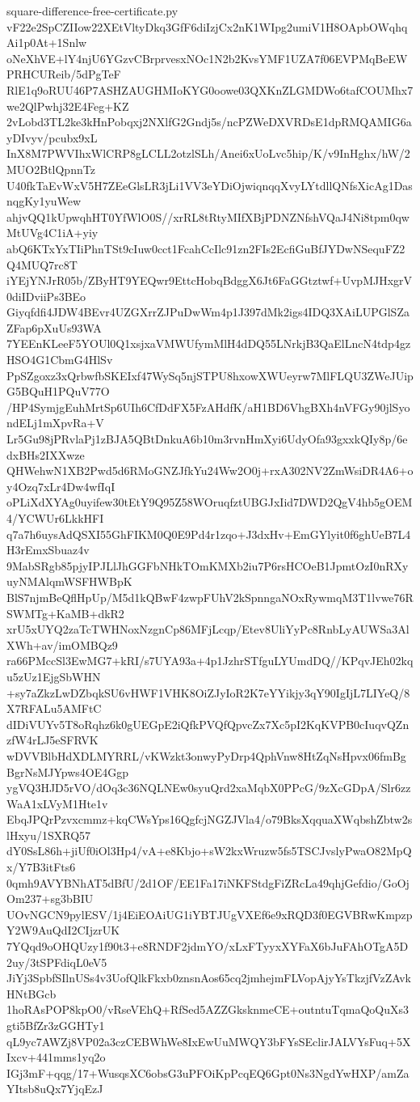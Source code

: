 \documentclass[11pt]{article}
\theoremstyle{definition}
\theoremstyle{remark}
\begin{document}
\begin{filecontents*}[overwrite]{square-difference-free-certificate.py}
vF22e2SpCZIIow22XEtVltyDkq3GfF6diIzjCx2nK1WIpg2umiV1H8OApbOWqhqAi1p0At+1Snlw
oNeXhVE+lY4njU6YGzvCBrprvesxNOc1N2b2KvsYMF1UZA7f06EVPMqBeEWPRHCUReib/5dPgTeF
RlE1q9oRUU46P7ASHZAUGHMIoKYG0oowe03QXKnZLGMDWo6tafCOUMhx7we2QlPwhj32E4Feg+KZ
2vLobd3TL2ke3kHnPobqxj2NXlfG2Gndj5s/ncPZWeDXVRDsE1dpRMQAMIG6ayDIvyv/pcubx9xL
InX8M7PWVIhxWlCRP8gLCLL2otzlSLh/Anei6xUoLvc5hip/K/v9InHghx/hW/2MUO2BtlQpnnTz
U40fkTaEvWxV5H7ZEeGlsLR3jLi1VV3eYDiOjwiqnqqXvyLYtdllQNfsXicAg1DasnqgKy1yuWew
ahjvQQ1kUpwqhHT0YfWlO0S//xrRL8tRtyMIfXBjPDNZNfshVQaJ4Ni8tpm0qwMtUVg4C1iA+yiy
abQ6KTxYxTIiPhnTSt9cIuw0cct1FcahCcIlc91zn2FIs2EcfiGuBfJYDwNSequFZ2Q4MUQ7rc8T
iYEjYNJrR05b/ZByHT9YEQwr9EttcHobqBdggX6Jt6FaGGtztwf+UvpMJHxgrV0diIDviiPs3BEo
Giyqfdfi4JDW4BEvr4UZGXrrZJPuDwWm4p1J397dMk2igs4IDQ3XAiLUPGlSZaZFap6pXuUs93WA
7YEEnKLeeF5YOUl0Q1xsjxaVMWUfymMlH4dDQ55LNrkjB3QaElLncN4tdp4gzHSO4G1CbmG4HlSv
PpSZgoxz3xQrbwfbSKEIxf47WySq5njSTPU8hxowXWUeyrw7MlFLQU3ZWeJUipG5BQuH1PQuV77O
/HP4SymjgEuhMrtSp6UIh6CfDdFX5FzAHdfK/aH1BD6VhgBXh4nVFGy90jlSyondELj1mXpvRa+V
Lr5Gu98jPRvlaPj1zBJA5QBtDnkuA6b10m3rvnHmXyi6UdyOfa93gxxkQIy8p/6edxBHs2IXXwze
QHWehwN1XB2Pwd5d6RMoGNZJfkYu24Ww2O0j+rxA302NV2ZmWsiDR4A6+oy4Ozq7xLr4Dw4wfIqI
oPLiXdXYAg0uyifew30tEtY9Q95Z58WOruqfztUBGJxIid7DWD2QgV4hb5gOEM4/YCWUr6LkkHFI
q7a7h6uysAdQSXI55GhFIKM0Q0E9Pd4r1zqo+J3dxHv+EmGYlyit0f6ghUeB7L4H3rEmxSbuaz4v
9MabSRgb85pjyIPJLlJhGGFbNHkTOmKMXb2iu7P6rsHCOeB1JpmtOzI0nRXyuyNMAlqmWSFHWBpK
BlS7njmBeQflHpUp/M5d1kQBwF4zwpFUhV2kSpnngaNOxRywmqM3T1lvwe76RSWMTg+KaMB+dkR2
xrU5xUYQ2zaTcTWHNoxNzgnCp86MFjLcqp/Etev8UliYyPc8RnbLyAUWSa3AlXWh+av/imOMBQz9
ra66PMccSl3EwMG7+kRI/s7UYA93a+4p1JzhrSTfguLYUmdDQ//KPqvJEh02kqu5zUz1EjgSbWHN
+sy7aZkzLwDZbqkSU6vHWF1VHK8OiZJyIoR2K7eYYikjy3qY90IgIjL7LIYeQ/8X7RFALu5AMFtC
dIDiVUYv5T8oRqhz6k0gUEGpE2iQfkPVQfQpvcZx7Xc5pI2KqKVPB0cIuqvQZnzfW4rLJ5eSFRVK
wDVVBlbHdXDLMYRRL/vKWzkt3onwyPyDrp4QphVnw8HtZqNsHpvx06fmBgBgrNsMJYpws4OE4Ggp
ygVQ3HJD5rVO/dOq3c36NQLNEw0syuQrd2xaMqbX0PPcG/9zXcGDpA/Slr6zzWaA1xLVyM1Hte1v
EbqJPQrPzvxcmmz+kqCWsYps16QgfcjNGZJVla4/o79BksXqquaXWqbshZbtw2slHxyu/1SXRQ57
dY0SsL86h+jiUf0iOl3Hp4/vA+e8Kbjo+sW2kxWruzw5fs5TSCJvslyPwaO82MpQx/Y7B3itFts6
0qmh9AVYBNhAT5dBfU/2d1OF/EE1Fa17iNKFStdgFiZRcLa49qhjGefdio/GoOjOm237+sg3bBIU
UOvNGCN9pylESV/1j4EiEOAiUG1iYBTJUgVXEf6e9xRQD3f0EGVBRwKmpzpY2W9AuQdI2CIjzrUK
7YQqd9oOHQUzy1f90t3+e8RNDF2jdmYO/xLxFTyyxXYFaX6bJuFAhOTgA5D2uy/3tSPFdiqL0eV5
JiYj3SpbfSIlnUSs4v3UofQlkFkxb0znsnAos65cq2jmhejmFLVopAjyYsTkzjfVzZAvkHNtBGcb
1hoRAsPOP8kpO0/vRseVEhQ+RfSed5AZZGksknmeCE+outntuTqmaQoQuXs3gti5BfZr3zGGHTy1
qL9yc7AWZj8VP02a3czCEBWhWe8IxEwUuMWQY3bFYsSEclirJALVYsFuq+5XIxcv+441mms1yq2o
IGj3mF+qqg/17+WusqsXC6obsG3uPFOiKpPcqEQ6Gpt0Ns3NgdYwHXP/amZaYItsb8uQx7YjqEzJ

\end{filecontents*}
\end{document}
